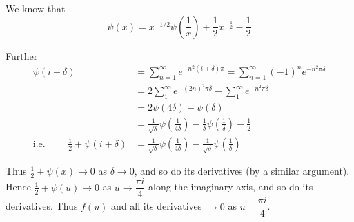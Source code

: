 We know that
$$
\psi(x) = x^{-1/2} \psi \left(\frac{1}{x} \right) + \frac{1}{2}
x^{-\frac{1}{2}} - \frac{1}{2}
$$

Further
\begin{align*}
\psi (i+\delta) & = \sum\limits^\infty_{n=1} e^{-n^2(i+\delta)\pi}  =
\sum\limits^\infty_{n=1} (-1)^n e^{-n^2 \pi \delta}\\
& = 2 \sum\limits^\infty_1 e^{-(2n)^2 \pi \delta} -
\sum\limits^\infty_1 e^{-n^2 \pi \delta}\\
& = 2 \psi (4\delta) -\psi (\delta)\\
& = \frac{1}{\surd \delta} \psi \left(\frac{1}{4\delta} \right) - \frac{1}{\delta}
\psi \left(\frac{1}{\delta} \right) - \frac{1}{2}\\
\text{i.e. } \qquad \frac{1}{2} + \psi (i+\delta) & = \frac{1}{\surd
  \delta} \psi \left( \frac{1}{4\delta}\right) - \frac{1}{\surd
  \delta} \psi \left( \frac{1}{\delta}\right)
\end{align*}

Thus $\frac{1}{2} + \psi (x) \to 0$ as $\delta \to 0$, and so do its
derivatives (by a similar argument). Hence $\frac{1}{2} + \psi (u) \to
0$ as $u \to \dfrac{\pi i}{4}$ along the imaginary axis, and so do its
derivatives. Thus $f(u)$ and all its derivatives $\to 0$ as $u -
\dfrac{\pi i}{4}$.
